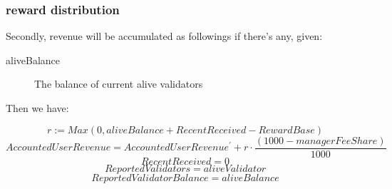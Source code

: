 \documentclass{article}
\begin{document}
\subsubsection{reward distribution}
Secondly, revenue will be accumulated as followings if there's any, given:
\begin{description}
\item[aliveBalance] The balance of current alive validators
\end{description}

Then we have:
\begin{theorem}[calcReward]
\label{calcReward}
\[r := Max(0, aliveBalance + RecentReceived - RewardBase)\]
\[AccountedUserRevenue = AccountedUserRevenue^{\prime} + r \cdot \frac{(1000 - managerFeeShare)}{1000}\]
\[RecentReceived = 0\]
\[ReportedValidators = aliveValidator\]
\[ReportedValidatorBalance = aliveBalance\]
\end{theorem}
\end{document}
